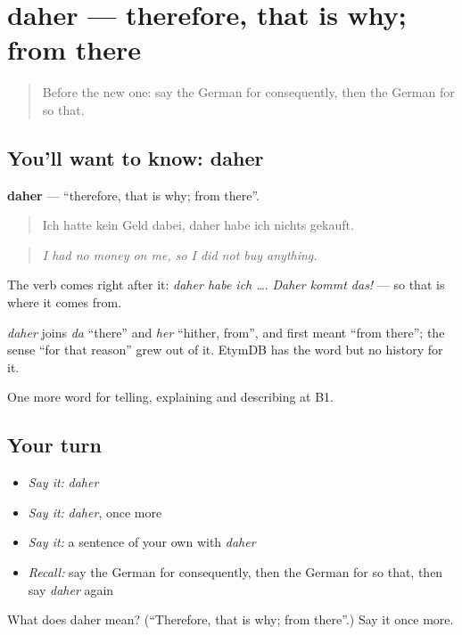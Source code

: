 \section[daher]{daher — therefore, that is why; from there}

\label{lesson:GE-C343-daher}



\begin{quote}
Before the new one: say the German for consequently, then the German for so that.
\end{quote}

\subsection*{You'll want to know: daher}
\textbf{daher} — \textquotedblleft{}therefore, that is why; from there\textquotedblright{}.

\begin{quote}
Ich hatte kein Geld dabei, daher habe ich nichts gekauft.
\end{quote}

\begin{quote}
\emph{I had no money on me, so I did not buy anything.}
\end{quote}

The verb comes right after it: \emph{daher habe ich …}. \emph{Daher kommt das!} — so that is where it comes from.

\begin{cousinweb}
\emph{daher} joins \emph{da} \textquotedblleft{}there\textquotedblright{} and \emph{her} \textquotedblleft{}hither, from\textquotedblright{}, and first meant \textquotedblleft{}from there\textquotedblright{}; the sense \textquotedblleft{}for that reason\textquotedblright{} grew out of it. EtymDB has the word but no history for it.
\end{cousinweb}

\begin{grammarlens}[title={What you've built}]
One more word for telling, explaining and describing at B1.
\end{grammarlens}

\subsection*{Your turn}
\begin{itemize}
\raggedright
  \item \emph{Say it:} \emph{daher}
  \item \emph{Say it:} \emph{daher}, once more
  \item \emph{Say it:} a sentence of your own with \emph{daher}
  \item \emph{Recall:} say the German for consequently, then the German for so that, then say \emph{daher} again
\end{itemize}

\begin{tcolorbox}[breakable,colback=teal!4,colframe=teal!35!black,title={Before you move on}]
What does daher mean? (\textquotedblleft{}Therefore, that is why; from there\textquotedblright{}.) Say it once more.
\end{tcolorbox}
